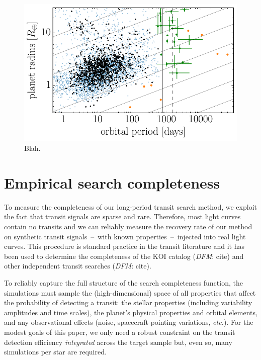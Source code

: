 \documentclass[manuscript, letterpaper]{aastex6}
\newcommand{\foreign}[1]{\emph{#1}}
\newcommand{\etc}{\foreign{etc.}}
\newcommand{\figlabel}[1]{\label{fig:#1}}
\newcommand{\todo}[3]{{\color{#2}\emph{#1}: #3}}
\newcommand{\dfmtodo}[1]{\todo{DFM}{red}{#1}}
\begin{document}
\begin{figure}
\vspace{\baselineskip}
\begin{center}
\includegraphics{figures/full_sample.pdf}
\end{center}
\caption{%
Blah.
\figlabel{full-sample}}
\end{figure}



\section{Empirical search completeness}

To measure the completeness of our long-period transit search method, we
exploit the fact that transit signals are sparse and rare.
Therefore, most light curves contain no transits and we can reliably measure
the recovery rate of our method on synthetic transit signals~--~with known
properties~--~injected into real light curves.
This procedure is standard practice in the transit literature and it has been
used to determine the completeness of the KOI catalog (\dfmtodo{cite}) and
other independent transit searches (\dfmtodo{cite}).

To reliably capture the full structure of the search completeness function,
the simulations must sample the (high-dimensional) space of all properties
that affect the probability of detecting a transit: the stellar properties
(including variability amplitudes and time scales), the planet's physical
properties and orbital elements, and any observational effects (noise,
spacecraft pointing variations, \etc).
For the modest goals of this paper, we only need a robust constraint on the
transit detection efficiency \emph{integrated} across the target sample but,
even so, many simulations per star are required.
\end{document}
